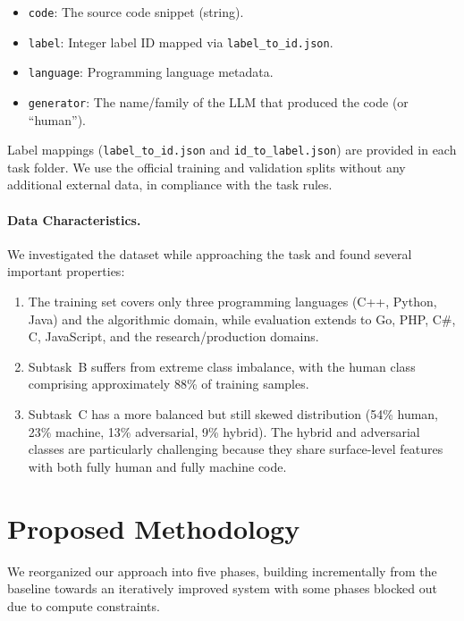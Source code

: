 \documentclass[11pt]{article}
\begin{document}
\begin{itemize}
    \item \texttt{code}: The source code snippet (string).
    \item \texttt{label}: Integer label ID mapped via \texttt{label\_to\_id.json}.
    \item \texttt{language}: Programming language metadata.
    \item \texttt{generator}: The name/family of the LLM that produced the code (or ``human'').
\end{itemize}

Label mappings (\texttt{label\_to\_id.json} and \texttt{id\_to\_label.json}) are provided in each task folder. We use the official training and validation splits without any additional external data, in compliance with the task rules.

\paragraph{Data Characteristics.} We investigated the dataset while approaching the task and found several important properties:
\begin{enumerate}
    \item The training set covers only three programming languages (C++, Python, Java) and the algorithmic domain, while evaluation extends to Go, PHP, C\#, C, JavaScript, and the research/production domains.
    \item Subtask~B suffers from extreme class imbalance, with the human class comprising approximately 88\% of training samples.
    \item Subtask~C has a more balanced but still skewed distribution (54\% human, 23\% machine, 13\% adversarial, 9\% hybrid). The hybrid and adversarial classes are particularly challenging because they share surface-level features with both fully human and fully machine code.
\end{enumerate}

\section{Proposed Methodology}
\label{sec:method}

We reorganized our approach into five phases, building incrementally from the baseline towards an iteratively improved system with some phases blocked out due to compute constraints.
\end{document}
